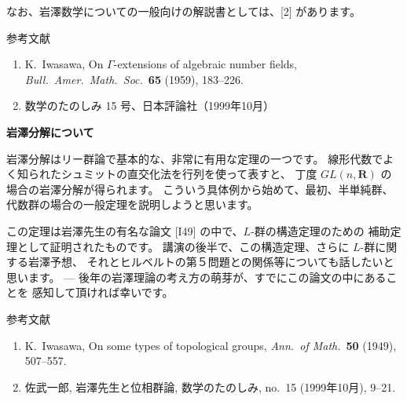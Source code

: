 \documentclass[uplatex,dvipdfmx]{jlreq}
\begin{document}
なお、岩澤数学についての一般向けの解説書としては、[2] があります。

\vspace{1pc}

\begin{center}
  \textsc{参考文献}
\end{center}
\begin{enumerate}
  \item K.~Iwasawa,
        On $\Gamma$-extensions of algebraic number fields,
        \textit{Bull.~Amer.~Math.~Soc.}~\textbf{65} (1959), 183--226.
  \item 数学のたのしみ 15 号、日本評論社（1999年10月）
\end{enumerate}

\newpage

\begin{center}
  {\Large\bfseries 岩澤分解について}
\end{center}

\bigskip
\hspace*{\fill}{\large\bfseries 佐武　一郎（東北大 / UC Berkeley）}

\bigskip

岩澤分解はリー群論で基本的な、非常に有用な定理の一つです。
線形代数でよく知られたシュミットの直交化法を行列を使って表すと、
丁度 $GL(n,\mathbf{R})$ の場合の岩澤分解が得られます。
こういう具体例から始めて、最初、半単純群、代数群の場合の一般定理を説明しようと思います。

この定理は岩澤先生の有名な論文 [I49] の中で、$L$-群の構造定理のための
補助定理として証明されたものです。
講演の後半で、この構造定理、さらに $L$-群に関する岩澤予想、
それとヒルベルトの第５問題との関係等についても話したいと思います。
--- 後年の岩澤理論の考え方の萌芽が、すでにこの論文の中にあることを
感知して頂ければ幸いです。

\vspace{6pt}

\begin{center}
  \textsc{参考文献}
\end{center}
\begin{enumerate}
  \item[{[I49]}] K.~Iwasawa,
        On some types of topological groups,
        \textit{Ann.~of Math.}~\textbf{50} (1949), 507--557.
  \item[{[S]}] 佐武一郎,
        岩澤先生と位相群論,
        数学のたのしみ, no.~15 (1999年10月), 9--21.
\end{enumerate}
\end{document}
